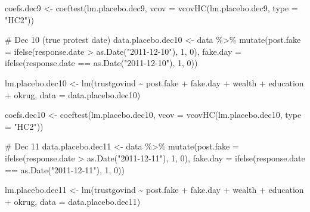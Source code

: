 \documentclass[
  letterpaper,
  DIV=11,
  numbers=noendperiod]{scrartcl}
\newenvironment{Shaded}{\begin{snugshade}}{\end{snugshade}}
\newcommand{\AttributeTok}[1]{\textcolor[rgb]{0.40,0.45,0.13}{#1}}
\newcommand{\CommentTok}[1]{\textcolor[rgb]{0.37,0.37,0.37}{#1}}
\newcommand{\DecValTok}[1]{\textcolor[rgb]{0.68,0.00,0.00}{#1}}
\newcommand{\FunctionTok}[1]{\textcolor[rgb]{0.28,0.35,0.67}{#1}}
\newcommand{\NormalTok}[1]{\textcolor[rgb]{0.00,0.23,0.31}{#1}}
\newcommand{\OtherTok}[1]{\textcolor[rgb]{0.00,0.23,0.31}{#1}}
\newcommand{\SpecialCharTok}[1]{\textcolor[rgb]{0.37,0.37,0.37}{#1}}
\newcommand{\StringTok}[1]{\textcolor[rgb]{0.13,0.47,0.30}{#1}}
\begin{document}
\begin{Shaded}
\begin{Highlighting}[]
\NormalTok{coefs.dec9 }\OtherTok{\textless{}{-}} \FunctionTok{coeftest}\NormalTok{(lm.placebo.dec9, }\AttributeTok{vcov =} \FunctionTok{vcovHC}\NormalTok{(lm.placebo.dec9, }\AttributeTok{type =} \StringTok{"HC2"}\NormalTok{))}

\CommentTok{\# Dec 10 (true protest date)}
\NormalTok{data.placebo.dec10 }\OtherTok{\textless{}{-}}\NormalTok{ data }\SpecialCharTok{\%\textgreater{}\%} 
  \FunctionTok{mutate}\NormalTok{(}\AttributeTok{post.fake =} \FunctionTok{ifelse}\NormalTok{(response.date }\SpecialCharTok{\textgreater{}} \FunctionTok{as.Date}\NormalTok{(}\StringTok{"2011{-}12{-}10"}\NormalTok{), }\DecValTok{1}\NormalTok{, }\DecValTok{0}\NormalTok{),}
         \AttributeTok{fake.day =} \FunctionTok{ifelse}\NormalTok{(response.date }\SpecialCharTok{==} \FunctionTok{as.Date}\NormalTok{(}\StringTok{"2011{-}12{-}10"}\NormalTok{), }\DecValTok{1}\NormalTok{, }\DecValTok{0}\NormalTok{))}

\NormalTok{lm.placebo.dec10 }\OtherTok{\textless{}{-}} \FunctionTok{lm}\NormalTok{(trustgovind }\SpecialCharTok{\textasciitilde{}}\NormalTok{ post.fake }\SpecialCharTok{+}\NormalTok{ fake.day }\SpecialCharTok{+}\NormalTok{ wealth }\SpecialCharTok{+}\NormalTok{ education }\SpecialCharTok{+}\NormalTok{ okrug, }
                       \AttributeTok{data =}\NormalTok{ data.placebo.dec10)}

\NormalTok{coefs.dec10 }\OtherTok{\textless{}{-}} \FunctionTok{coeftest}\NormalTok{(lm.placebo.dec10, }\AttributeTok{vcov =} \FunctionTok{vcovHC}\NormalTok{(lm.placebo.dec10, }\AttributeTok{type =} \StringTok{"HC2"}\NormalTok{))}

\CommentTok{\# Dec 11}
\NormalTok{data.placebo.dec11 }\OtherTok{\textless{}{-}}\NormalTok{ data }\SpecialCharTok{\%\textgreater{}\%} 
  \FunctionTok{mutate}\NormalTok{(}\AttributeTok{post.fake =} \FunctionTok{ifelse}\NormalTok{(response.date }\SpecialCharTok{\textgreater{}} \FunctionTok{as.Date}\NormalTok{(}\StringTok{"2011{-}12{-}11"}\NormalTok{), }\DecValTok{1}\NormalTok{, }\DecValTok{0}\NormalTok{),}
         \AttributeTok{fake.day =} \FunctionTok{ifelse}\NormalTok{(response.date }\SpecialCharTok{==} \FunctionTok{as.Date}\NormalTok{(}\StringTok{"2011{-}12{-}11"}\NormalTok{), }\DecValTok{1}\NormalTok{, }\DecValTok{0}\NormalTok{))}

\NormalTok{lm.placebo.dec11 }\OtherTok{\textless{}{-}} \FunctionTok{lm}\NormalTok{(trustgovind }\SpecialCharTok{\textasciitilde{}}\NormalTok{ post.fake }\SpecialCharTok{+}\NormalTok{ fake.day }\SpecialCharTok{+}\NormalTok{ wealth }\SpecialCharTok{+}\NormalTok{ education }\SpecialCharTok{+}\NormalTok{ okrug, }
                       \AttributeTok{data =}\NormalTok{ data.placebo.dec11)}


\end{Highlighting}
\end{Shaded}
\end{document}
